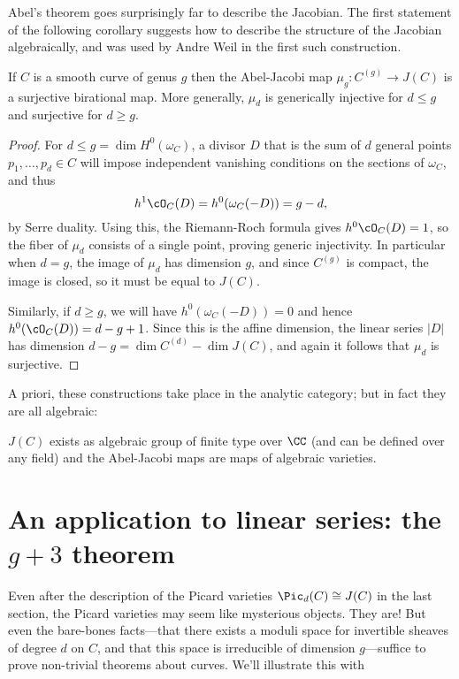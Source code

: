 Abel's theorem goes surprisingly far to describe the Jacobian. The first statement of the following corollary suggests how to describe the structure of the Jacobian algebraically, and was used by Andre Weil in the first such construction.

\begin{corollary}
If $C$ is a smooth curve of genus $g$ then the Abel-Jacobi map $\mu_{g}: C^{(g)} \to J(C)$ is a surjective birational map.
More generally, $\mu_{d}$ is generically injective for $d\leq g$ and surjective for $d\geq g$.
\end{corollary}

\begin{proof}
For $d\leq g = \dim H^{0}(\omega_{C})$,  a divisor $D$ that is the sum of $d$ general points $p_{1}, \dots,  p_{d} \in C$ will impose independent vanishing conditions on the sections of $\omega_{C}$, and thus
$$
h^{1}\cO_{C}(D) = h^0(\omega_C(-D)) = g-d,
$$
by Serre duality. Using this, the Riemann-Roch formula gives $h^{0}\cO_{C}(D) = 1$, so the fiber of 
$\mu_{d}$ consists of a single point, proving generic injectivity. In particular when $d= g$, the image of $\mu_{d}$ has
dimension $g$, and since $C^{(g)}$ is compact, the image is closed, so it must be equal to $J(C)$.

Similarly, if $d \geq g$, we will have $h^0(\omega_C(-D)) = 0$ and hence $h^0(\cO_C(D)) = d-g+1$. Since this is the affine
dimension, the linear series $|D|$ has dimension $d-g = \dim C^{(d)} - \dim J(C)$, and again it follows that
$\mu_{d}$ is surjective.
\end{proof}
%

A priori, these constructions take place in the analytic category; but in fact they are all algebraic:

\begin{fact}
$J(C)$ exists as algebraic group of finite type over $\CC$ (and can be defined over any field) and the Abel-Jacobi maps are
maps of algebraic varieties.
\end{fact}

\section{An application to linear series: the $g+3$ theorem}

Even after the description of the Picard varieties $\Pic_d(C) \cong J(C)$ in the last section, the Picard varieties may seem like mysterious objects. They are! But even the bare-bones facts---that there exists a  moduli space for invertible sheaves of degree $d$ on $C$, and that this space is irreducible of dimension $g$---suffice to prove non-trivial theorems about curves. We'll illustrate this with 


